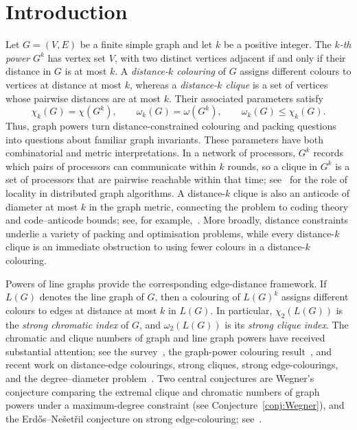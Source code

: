 \documentclass[11pt]{article}
\theoremstyle{plain}
\numberwithin{equation}{section}
\begin{document}
\section{Introduction}
Let $G=(V,E)$ be a finite simple graph and let $k$ be a positive integer. The \emph{$k$-th power} $G^k$ has vertex set $V$, with two distinct vertices adjacent if and only if their distance in $G$ is at most $k$. A \emph{distance-$k$ colouring} of $G$ assigns different colours to vertices at distance at most $k$, whereas a \emph{distance-$k$ clique} is a set of vertices whose pairwise distances are at most $k$. Their associated parameters satisfy
\[
    \chi_k(G)=\chi(G^k),\qquad
    \omega_k(G)=\omega(G^k),\qquad
    \omega_k(G)\leq\chi_k(G).
\]
Thus, graph powers turn distance-constrained colouring and packing questions into questions about familiar graph invariants.
These parameters have both combinatorial and metric interpretations. In a network of processors, $G^k$ records which pairs of processors can communicate within $k$ rounds, so a clique in $G^k$ is a set of processors that are pairwise reachable within that time; see~\cite{Linial_1992} for the role of locality in distributed graph algorithms. A distance-$k$ clique is also an anticode of diameter at most $k$ in the graph metric, connecting the problem to coding theory and code--anticode bounds; see, for example,~\cite{Shi_Xia_Krotov_2023}. More broadly, distance constraints underlie a variety of packing and optimisation problems, while every distance-$k$ clique is an immediate obstruction to using fewer colours in a distance-$k$ colouring.

Powers of line graphs provide the corresponding edge-distance framework. If $L(G)$ denotes the line graph of $G$, then a colouring of $L(G)^k$ assigns different colours to edges at distance at most $k$ in $L(G)$. In particular, $\chi_2(L(G))$ is the \emph{strong chromatic index} of $G$, and $\omega_2(L(G))$ is its \emph{strong clique index}. The chromatic and clique numbers of graph and line graph powers have received substantial attention; see the survey~\cite{Cranston_2023}, the graph-power colouring result~\cite{Pierron_2024}, and recent work on distance-edge colourings, strong cliques, strong edge-colourings, and the degree--diameter problem~\cite{Abiad_Reijnders_2026,Kumar_Mohar_Pragada_2026,Davey_Hurley_Verclos_Kang_Volec_2026,vanBatenburg_Korsky_2026}. Two central conjectures are Wegner's conjecture comparing the extremal clique and chromatic numbers of graph powers under a maximum-degree constraint (see Conjecture~\ref{conj:Wegner}), and the Erd\H{o}s--Ne\v{s}et\v{r}il conjecture on strong edge-colouring; see~\cite[Sections~2 and~4]{Cranston_2023}. %
\end{document}
